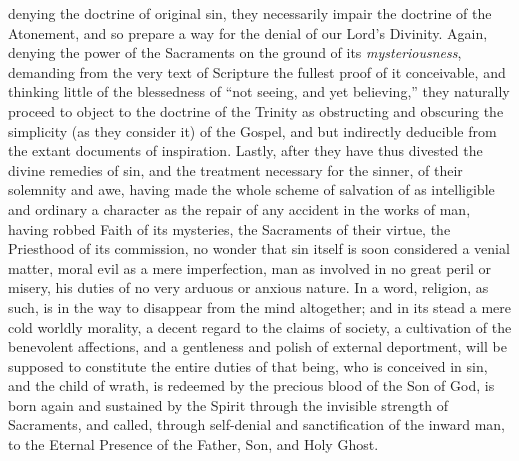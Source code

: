 denying the doctrine of original sin, they necessarily impair the
doctrine of the Atonement, and so prepare a way for the denial of our
Lord's Divinity. Again, denying the power of the Sacraments on the
ground of its \emph{mysteriousness}, demanding from the very text of
Scripture the fullest proof of it conceivable, and thinking little of
the blessedness of ``not seeing, and yet believing,'' they
naturally proceed to object to the doctrine of the Trinity as
obstructing and obscuring the simplicity (as they consider it) of the
Gospel, and but indirectly deducible from the extant documents of
inspiration. Lastly, after they have thus divested the divine remedies
of sin, and the treatment necessary for the sinner, of their solemnity
and awe, having made the whole scheme of salvation of as intelligible
and ordinary a character as the repair of any accident in the works of
man, having robbed Faith of its mysteries, the Sacraments of their
virtue, the Priesthood of its commission, no wonder that sin itself is
soon considered a venial matter, moral evil as a mere imperfection, man
as involved in no great peril or misery, his duties of no very arduous
or anxious nature. In a word, religion, as such, is in the way to
disappear from the mind altogether; and in its stead a mere cold worldly
morality, a decent regard to the claims of society, a cultivation of the
benevolent affections, and a gentleness and polish of external
deportment, will be supposed to constitute the entire duties of that
being, who is conceived in sin, and the child of wrath, is redeemed by
the precious blood of the Son of God, is born again and sustained by the
Spirit through the invisible strength of Sacraments, and called, through
self-denial and sanctification of the inward man, to the Eternal
Presence of the Father, Son, and Holy Ghost.

